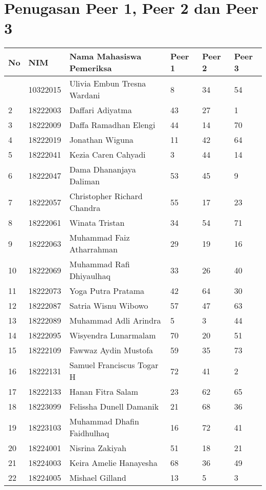 \documentclass[
  letterpaper,
  DIV=11,
  numbers=noendperiod]{scrreprt}
\begin{document}
\section{Penugasan Peer 1, Peer 2 dan Peer
3}\label{penugasan-peer-1-peer-2-dan-peer-3}

\begin{longtable}[]{@{}llllll@{}}
\toprule\noalign{}
No & NIM & Nama Mahasiswa Pemeriksa & Peer 1 & Peer 2 & Peer 3 \\
\midrule\noalign{}
\endhead
\bottomrule\noalign{}
\endlastfoot
1 & 10322015 & Ulivia Embun Tresna Wardani & 8 & 34 & 54 \\
2 & 18222003 & Daffari Adiyatma & 43 & 27 & 1 \\
3 & 18222009 & Daffa Ramadhan Elengi & 44 & 14 & 70 \\
4 & 18222019 & Jonathan Wiguna & 11 & 42 & 64 \\
5 & 18222041 & Kezia Caren Cahyadi & 3 & 44 & 14 \\
6 & 18222047 & Dama Dhananjaya Daliman & 53 & 45 & 9 \\
7 & 18222057 & Christopher Richard Chandra & 55 & 17 & 23 \\
8 & 18222061 & Winata Tristan & 34 & 54 & 71 \\
9 & 18222063 & Muhammad Faiz Atharrahman & 29 & 19 & 16 \\
10 & 18222069 & Muhammad Rafi Dhiyaulhaq & 33 & 26 & 40 \\
11 & 18222073 & Yoga Putra Pratama & 42 & 64 & 30 \\
12 & 18222087 & Satria Wisnu Wibowo & 57 & 47 & 63 \\
13 & 18222089 & Muhammad Adli Arindra & 5 & 3 & 44 \\
14 & 18222095 & Wisyendra Lunarmalam & 70 & 20 & 51 \\
15 & 18222109 & Fawwaz Aydin Mustofa & 59 & 35 & 73 \\
16 & 18222131 & Samuel Franciscus Togar H & 72 & 41 & 2 \\
17 & 18222133 & Hanan Fitra Salam & 23 & 62 & 65 \\
18 & 18223099 & Felissha Dunell Damanik & 21 & 68 & 36 \\
19 & 18223103 & Muhammad Dhafin Faidhulhaq & 16 & 72 & 41 \\
20 & 18224001 & Nisrina Zakiyah & 51 & 18 & 21 \\
21 & 18224003 & Keira Amelie Hanayesha & 68 & 36 & 49 \\
22 & 18224005 & Mishael Gilland & 13 & 5 & 3 \\

\end{longtable}
\end{document}
